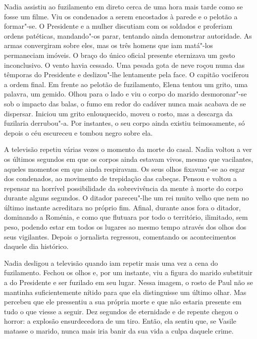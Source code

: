 \bigskip

Nadia assistiu ao fuzilamento em direto cerca de uma hora mais tarde
como se fosse um filme. Viu os condenados a serem encostados à parede
e o pelotão a formar"-se. O Presidente e a mulher discutiam com os
soldados e proferiam ordens patéticas, mandando"-os parar, tentando ainda
demonstrar autoridade. As armas convergiram sobre eles, mas os três
homens que iam matá"-los permaneciam imóveis. O braço do único oficial
presente eternizava um gesto inconclusivo. O vento havia cessado. Uma
pesada gota de neve roçou numa das têmporas do Presidente e deslizou"-lhe
lentamente pela face. O capitão vociferou a ordem final. Em frente ao
pelotão de fuzilamento, Elena tentou um grito, uma palavra, um gemido.
Olhou para o lado e viu o corpo do marido desmoronar"-se sob o impacto
das balas, o fumo em redor do cadáver nunca mais acabava de se dispersar. Iniciou um grito enlouquecido, moveu o rosto, mas
a descarga da fuzilaria derrubou"-a. Por instantes, o seu corpo ainda
existiu teimosamente, só depois o céu escureceu e tombou negro sobre
ela.

A televisão repetiu várias vezes o momento da morte do casal. Nadia
voltou a ver os últimos segundos em que os corpos ainda estavam vivos,
mesmo que vacilantes, aqueles momentos em que ainda respiravam. Os
seus olhos fixavam"-se ao esgar dos condenados, ao movimento de
trepidação das cabeças. Pensou e voltou a repensar na horrível
possibilidade da sobrevivência da mente à morte do corpo durante alguns
segundos. O ditador pareceu"-lhe um rei muito velho que nem no último
instante acreditara no próprio fim. Afinal, durante anos fora o ditador,
dominando a Roménia, e como que flutuara por todo o território,
ilimitado, sem peso, podendo estar em todos os lugares ao mesmo tempo
através dos olhos dos seus vigilantes. Depois o jornalista regressou,
comentando os acontecimentos daquele dia histórico.

Nadia desligou a televisão quando iam repetir mais uma
vez a cena do fuzilamento. Fechou os olhos e, por um instante, viu a
figura do marido substituir a do Presidente e ser fuzilado em seu lugar.
Nessa imagem, o rosto de Paul não se mantinha suficientemente nítido
para que ela distinguisse um último olhar. Mas percebeu que ele
pressentiu a sua própria morte e que não estaria presente em tudo o que
viesse a seguir. Dez segundos de eternidade e de repente chegou o
horror: a explosão ensurdecedora de um tiro. Então, ela sentiu que, se
Vasile matasse o marido, nunca mais iria banir da sua vida a culpa
daquele crime.

